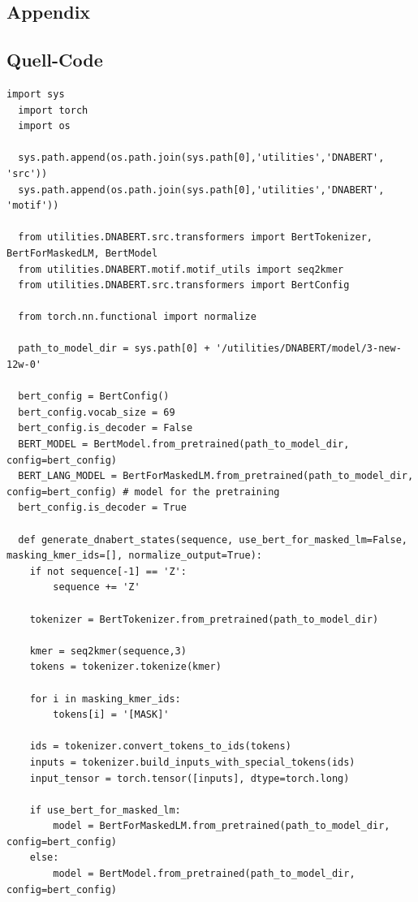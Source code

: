 \documentclass[oneside,bibliography=totocnumbered,BCOR=5mm]{scrbook}%
\theoremstyle{definition}
\theoremstyle{definition}
\theoremstyle{definition}
\theoremstyle{definition}
\theoremstyle{definition}
\theoremstyle{definition}
\begin{document}
\begin{appendix}


\chapter{Appendix}


\section{Quell-Code}


\begin{lstlisting}[caption={Generierung der DNABERT-States anhand der Input-DNA-Sequenz}]
  import sys
  import torch
  import os

  sys.path.append(os.path.join(sys.path[0],'utilities','DNABERT', 'src'))
  sys.path.append(os.path.join(sys.path[0],'utilities','DNABERT', 'motif'))

  from utilities.DNABERT.src.transformers import BertTokenizer, BertForMaskedLM, BertModel
  from utilities.DNABERT.motif.motif_utils import seq2kmer
  from utilities.DNABERT.src.transformers import BertConfig

  from torch.nn.functional import normalize

  path_to_model_dir = sys.path[0] + '/utilities/DNABERT/model/3-new-12w-0'

  bert_config = BertConfig()
  bert_config.vocab_size = 69
  bert_config.is_decoder = False
  BERT_MODEL = BertModel.from_pretrained(path_to_model_dir, config=bert_config)
  BERT_LANG_MODEL = BertForMaskedLM.from_pretrained(path_to_model_dir, config=bert_config) # model for the pretraining
  bert_config.is_decoder = True
  
  def generate_dnabert_states(sequence, use_bert_for_masked_lm=False, masking_kmer_ids=[], normalize_output=True):
    if not sequence[-1] == 'Z': 
        sequence += 'Z'

    tokenizer = BertTokenizer.from_pretrained(path_to_model_dir)

    kmer = seq2kmer(sequence,3)
    tokens = tokenizer.tokenize(kmer)

    for i in masking_kmer_ids:
        tokens[i] = '[MASK]'

    ids = tokenizer.convert_tokens_to_ids(tokens)
    inputs = tokenizer.build_inputs_with_special_tokens(ids)
    input_tensor = torch.tensor([inputs], dtype=torch.long)

    if use_bert_for_masked_lm:
        model = BertForMaskedLM.from_pretrained(path_to_model_dir, config=bert_config)
    else:
        model = BertModel.from_pretrained(path_to_model_dir, config=bert_config)
        

\end{lstlisting}
\end{appendix}
\end{document}
